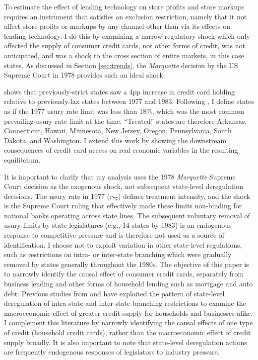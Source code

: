\documentclass[12pt,english]{article}
\begin{document}
To estimate the effect of lending technology on store profits and store markups requires an instrument that satisfies an exclusion restriction, namely that it not affect store profits or markups by any channel other than via its effects on lending technology. I do this by examining a narrow regulatory shock which only affected the supply of consumer credit cards, not other forms of credit, was not anticipated, and was a shock to the cross section of entire markets, in this case states. As discussed in Section \ref{sec:trends}, the \emph{Marquette} decision by the US Supreme Court in 1978 provides such an ideal shock. 

 \cite{zinman_impact_2003} shows that previously-strict states saw a 4pp increase in credit card holding relative to previously-lax states between 1977 and 1983. Following \cite{zinman_impact_2003}, I define states as  if the 1977 usury rate limit was less than 18\%, which was the most common prevailing usury rate limit at the time. ``Treated'' states are therefore Arkansas, Connecticut, Hawaii, Minnesota, New Jersey, Oregon, Pennsylvania, South Dakota, and Washington. I extend this work by showing the downstream consequences of credit card access on real economic variables in the resulting equilibrium.

It is important to clarify that my analysis uses the 1978 \emph{Marquette} Supreme Court decision as the exogenous shock, not subsequent state-level deregulation decisions. The usury rate in 1977 ($r_{77}$) defines treatment intensity, and the shock is the Supreme Court ruling that effectively made these limits non-binding for national banks operating across state lines. The subsequent voluntary removal of usury limits by state legislatures (e.g., 14 states by 1983) is an endogenous response to competitive pressure and is therefore not used as a source of identification. I choose not to exploit variation in other state-level regulations, such as restrictions on intra- or inter-state branching which were gradually removed by states generally throughout the 1980s. The objective of this paper is to narrowly identify the causal effect of consumer credit cards, separately from business lending and other forms of household lending such as mortgage and auto debt. Previous studies from  \cite{jayaratne_entry_1998} and \cite{mian_how_2020} have exploited the pattern of state-level deregulation of intra-state and inter-state branching restrictions to examine the macroeconomic effect of greater credit supply for households and businesses alike. I complement this literature by narrowly identifying the causal effects of one type of credit (household credit cards), rather than the macroeconomic effect of credit supply broadly. It is also important to note that state-level deregulation actions are frequently endogenous responses of legislators to industry pressure. 
\end{document}
